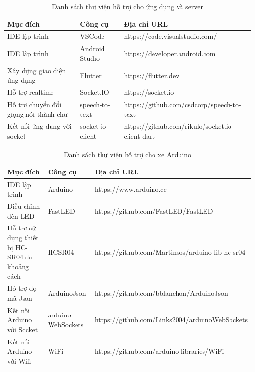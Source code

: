 \documentclass[../DoAn.tex]{subfiles}
\begin{document}
\begin{table}[H]
\begin{tabular}{| p{4cm} | p{2cm} | p{9cm} |}
\hline
\rowcolor[HTML]{FFCE93} 
\textbf{Mục đích}                & \textbf{Công cụ} & \textbf{Địa chỉ URL}                          \\ \hline
IDE lập trình                    & VSCode           & https://code.visualstudio.com/                \\ \hline
IDE lập trình        & Android Studio        & https://developer.android.com                     \\ \hline
Xây dựng giao diện ứng dụng        & Flutter   & https://flutter.dev \\ \hline
Hỗ trợ realtime & Socket.IO      & https://socket.io   \\ \hline
Hỗ trợ chuyển đổi giọng nói thành chữ                  & speech-to-text        & https://github.com/csdcorp/speech-to-text   \\ \hline
Kết nối ứng dụng với socket                & socket-io-client          & https://github.com/rikulo/socket.io-client-dart                     \\ \hline
\end{tabular}
\caption{Danh sách thư viện hỗ trợ cho ứng dụng và server}
\end{table}

\begin{table}[H]
\begin{tabular}{| p{4cm} | p{2cm} | p{9cm} |}
\hline
\rowcolor[HTML]{FFCE93} 
\textbf{Mục đích}                & \textbf{Công cụ} & \textbf{Địa chỉ URL}                          \\ \hline
IDE lập trình        & Arduino           & https://www.arduino.cc                           \\ \hline
Điều chỉnh đèn LED        & FastLED   & https://github.com/FastLED/FastLED \\ \hline
Hỗ trợ sử dụng thiết bị HC-SR04 đo khoảng cách & HCSR04      & https://github.com/Martinsos/arduino-lib-hc-sr04   \\ \hline
Hỗ trợ đọ mã Json                  & ArduinoJson        & https://github.com/bblanchon/ArduinoJson   \\ \hline
Kết nối Arduino với Socket                & arduino WebSockets          & https://github.com/Links2004/arduinoWebSockets   \\ \hline
Kết nối Arduino với Wifi              & WiFi          & https://github.com/arduino-libraries/WiFi                     \\ \hline
\end{tabular}
\caption{Danh sách thư viện hỗ trợ cho xe Arduino}
\end{table}
\end{document}
